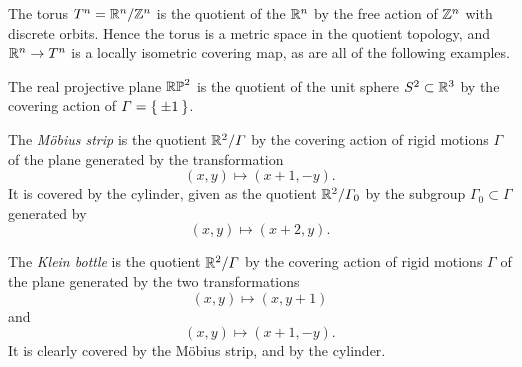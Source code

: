 \begin{example}
The torus \(T^n=\mathbb{R}^{n}/\mathbb{Z}^{n}\) is the quotient of the \(\mathbb{R}^{n}\) by the free action of \(\mathbb{Z}^{n}\) with discrete orbits.
Hence the torus is a metric space in the quotient topology, and \(\mathbb{R}^{n} \to T^n\) is a locally isometric covering map, as are all of the following examples.
\end{example}
\begin{example}
The real projective plane \(\mathbb{RP}^{2}\) is the quotient of the unit sphere \(S^2 \subset \mathbb{R}^{3}\) by the covering action of \(\Gamma=\Set{\pm 1}\).
\end{example}
\begin{example}
The \emph{M\"obius strip}%
is the quotient \(\mathbb{R}^{2}/\Gamma\) by the covering action of rigid motions \(\Gamma\) of the plane generated by the transformation 
\[
(x,y) \mapsto (x+1,-y).
\]
It is covered by the cylinder, given as the quotient \(\mathbb{R}^{2}/\Gamma_0\) by the subgroup \(\Gamma_0 \subset \Gamma\) generated by
\[
(x,y) \mapsto (x+2,y).
\]
\begin{center}
\end{center}
\end{example}
\begin{example}
The \emph{Klein bottle}%
 is the quotient \(\mathbb{R}^{2}/\Gamma\) by the covering action of rigid motions \(\Gamma\) of the plane generated by the two transformations
\[
(x,y) \mapsto (x,y+1)
\]
and
\[
(x,y) \mapsto (x+1,-y).
\]
It is clearly covered by the M\"obius strip, and by the cylinder.
\end{example}

